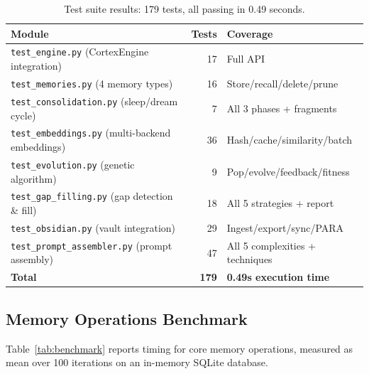 \documentclass[runningheads]{llncs}
\begin{document}
\begin{table}[t]
\centering
\caption{Test suite results: 179 tests, all passing in 0.49 seconds.}\label{tab:tests}
{\small
\begin{tabularx}{\textwidth}{lrX}
\toprule
\textbf{Module} & \textbf{Tests} & \textbf{Coverage} \\
\midrule
\texttt{test\_engine.py} (CortexEngine integration) & 17 & Full API \\
\texttt{test\_memories.py} (4 memory types) & 16 & Store/recall/delete/prune \\
\texttt{test\_consolidation.py} (sleep/dream cycle) & 7 & All 3 phases + fragments \\
\texttt{test\_embeddings.py} (multi-backend embeddings) & 36 & Hash/cache/similarity/batch \\
\texttt{test\_evolution.py} (genetic algorithm) & 9 & Pop/evolve/feedback/fitness \\
\texttt{test\_gap\_filling.py} (gap detection \& fill) & 18 & All 5 strategies + report \\
\texttt{test\_obsidian.py} (vault integration) & 29 & Ingest/export/sync/PARA \\
\texttt{test\_prompt\_assembler.py} (prompt assembly) & 47 & All 5 complexities + techniques \\
\midrule
\textbf{Total} & \textbf{179} & \textbf{0.49s execution time} \\
\bottomrule
\end{tabularx}
}
\end{table}

\subsection{Memory Operations Benchmark}

Table~\ref{tab:benchmark} reports timing for core memory operations, measured as mean over 100 iterations on an in-memory SQLite database.
\end{document}
